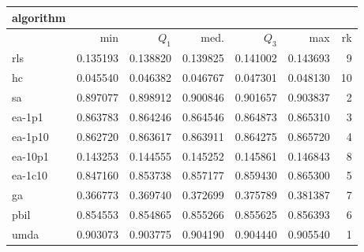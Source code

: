 \begin{tabular}{@{}l*{5}{>{{}}N{1}{3}}>{{}}N{2}{0}@{}}
\toprule
{algorithm} &  \\
\midrule
& {min} & {$Q_1$} & {med.} & {$Q_3$} & {max} & {rk}\\
\midrule
rls & 0.135193 & 0.138820 & 0.139825 & 0.141002 & 0.143693 & 9\\
hc & 0.045540 & 0.046382 & 0.046767 & 0.047301 & 0.048130 & 10\\
sa & 0.897077 & 0.898912 & 0.900846 & 0.901657 & 0.903837 & 2\\
ea-1p1 & 0.863783 & 0.864246 & 0.864546 & 0.864873 & 0.865310 & 3\\
ea-1p10 & 0.862720 & 0.863617 & 0.863911 & 0.864275 & 0.865720 & 4\\
ea-10p1 & 0.143253 & 0.144555 & 0.145252 & 0.145861 & 0.146843 & 8\\
ea-1c10 & 0.847160 & 0.853738 & 0.857177 & 0.859430 & 0.865300 & 5\\
ga & 0.366773 & 0.369740 & 0.372699 & 0.375789 & 0.381387 & 7\\
pbil & 0.854553 & 0.854865 & 0.855266 & 0.855625 & 0.856393 & 6\\
umda & {\color{blue}} 0.903073 & {\color{blue}} 0.903775 & {\color{blue}} 0.904190 & {\color{blue}} 0.904440 & {\color{blue}} 0.905540 & 1\\
\bottomrule
\end{tabular}
